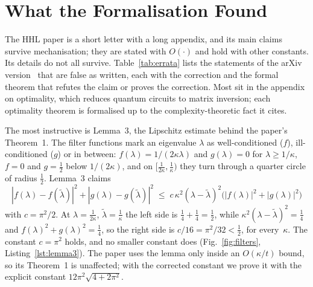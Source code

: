 \section{What the Formalisation Found}\label{sec:errata}

The HHL paper is a short letter with a long appendix, and its main claims survive mechanisation; they
are stated with $O(\cdot)$ and hold with other constants. Its details do not all survive.
Table~\ref{tab:errata} lists the statements of the arXiv version~\cite{hhl2008arxiv} that are false as
written, each with the correction and the formal theorem that refutes the claim or proves the
correction. Most sit in the appendix on optimality, which reduces quantum circuits to matrix
inversion; each optimality theorem is formalised up to the complexity-theoretic fact it cites.

The most instructive is Lemma~3, the Lipschitz estimate behind the paper's Theorem~1. The filter
functions mark an eigenvalue $\lambda$ as well-conditioned ($f$), ill-conditioned ($g$) or in between:
$f(\lambda)=1/(2\kappa\lambda)$ and $g(\lambda)=0$ for $\lambda\ge1/\kappa$, $f=0$ and $g=\frac12$ below
$1/(2\kappa)$, and on $[\frac1{2\kappa},\frac1\kappa)$ they turn through a quarter circle of radius
$\frac12$. Lemma~3 claims
\[
|f(\lambda)-f(\tilde\lambda)|^2+|g(\lambda)-g(\tilde\lambda)|^2\;\le\;c\,\kappa^2(\lambda-\tilde\lambda)^2\bigl(|f(\lambda)|^2+|g(\lambda)|^2\bigr)
\]
with $c=\pi^2/2$. At $\lambda=\frac1{2\kappa}$, $\tilde\lambda=\frac1\kappa$ the left side is $\frac14+\frac14=\frac12$,
while $\kappa^2(\lambda-\tilde\lambda)^2=\frac14$ and $f(\lambda)^2+g(\lambda)^2=\frac14$, so the right side is
$c/16=\pi^2/32<\frac12$, for every~$\kappa$. The constant $c=\pi^2$
holds, and no smaller constant does (Fig.~\ref{fig:filters}, Listing~\ref{lst:lemma3}). The paper uses the lemma only inside an
$O(\kappa/t)$ bound, so its Theorem~1 is unaffected; with the corrected constant we prove it with
the explicit constant $12\pi^2\sqrt{4+2\pi^2}$.

